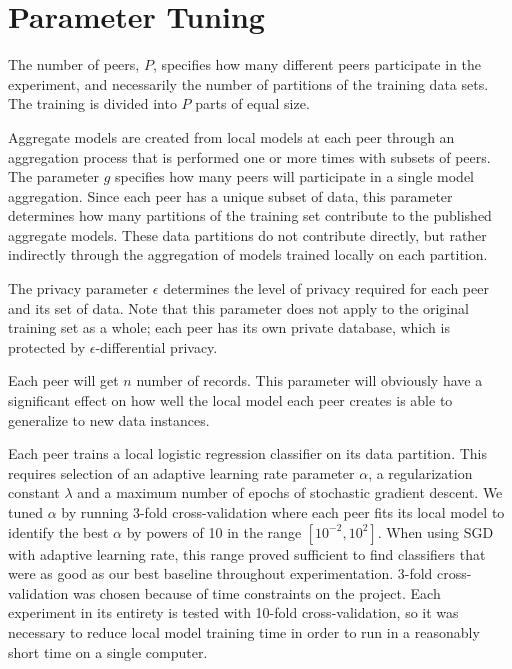 \section{Parameter Tuning}
\label{sec:parameter_tuning}
The number of peers, $P$, specifies how many different peers participate in the experiment, and necessarily the number of partitions of the training data sets. The training is divided into $P$ parts of equal size.

Aggregate models are created from local models at each peer through an aggregation process that is performed one or more times with subsets of peers. The parameter $g$ specifies how many peers will participate in a single model aggregation. Since each peer has a unique subset of data, this parameter determines how many partitions of the training set contribute to the published aggregate models. These data partitions do not contribute directly, but rather indirectly through the aggregation of models trained locally on each partition.

The privacy parameter $\epsilon$ determines the level of privacy required for each peer and its set of data. Note that this parameter does not apply to the original training set as a whole; each peer has its own private database, which is protected by $\epsilon$-differential privacy. 

Each peer will get $n$ number of records. This parameter will obviously have a significant effect on how well the local model each peer creates is able to generalize to new data instances. 

Each peer trains a local logistic regression classifier on its data partition. This requires selection of an adaptive learning rate parameter $\alpha$, a regularization constant $\lambda$ and a maximum number of epochs of stochastic gradient descent. We tuned $\alpha$ by running 3-fold cross-validation where each peer fits its local model to identify the best $\alpha$ by powers of 10 in the range $[10^{-2}, 10^{2}]$. When using SGD with adaptive learning rate, this range proved sufficient to find classifiers that were as good as our best baseline throughout experimentation. 3-fold cross-validation was chosen because of time constraints on the project. Each experiment in its entirety is tested with 10-fold cross-validation, so it was necessary to reduce local model training time in order to run in a reasonably short time on a single computer.

